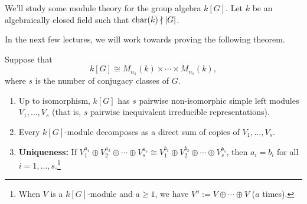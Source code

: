 We'll study some module theory for the group algebra $k[G]$. Let 
$k$ be an algebraically closed field such that $\operatorname{char}(k) \nmid |G|$. 

In the next few lectures, we will work towards proving the following theorem. 

\begin{thm}
    Suppose that 
    \[ k[G] \cong M_{n_1}(k) \times \cdots \times M_{n_s}(k), \] 
    where $s$ is the number of conjugacy classes of $G$. 
    \begin{enumerate}[(1)]
        \item Up to isomorphism, $k[G]$ has $s$ pairwise non-isomorphic 
        simple left modules $V_1, \dots, V_s$ (that is, $s$ pairwise 
        inequivalent irreducible representations). 
        \item Every $k[G]$-module decomposes as a direct sum of copies of 
        $V_1, \dots, V_s$. 
        \item {\bf Uniqueness:} If $V_1^{a_1} \oplus V_2^{a_2} \oplus 
        \cdots \oplus V_s^{a_s} \cong V_1^{b_1} \oplus V_2^{b_2} \oplus 
        \cdots \oplus V_s^{b_s}$, then $a_i = b_i$ for all 
        $i = 1, \dots, s$.\footnote[1]{When $V$ is a $k[G]$-module 
        and $a \geq 1$, we have $V^a := V \oplus \cdots \oplus V$ 
        ($a$ times).}
    \end{enumerate}
\end{thm}

